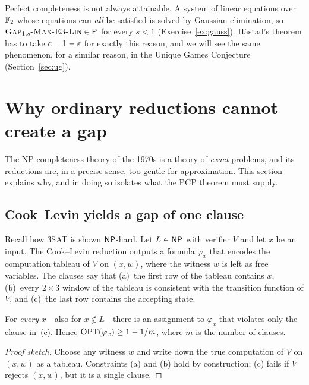 \begin{remark}
Perfect completeness is not always attainable.  A system of linear equations over $\mathbb{F}_2$ whose
equations can \emph{all} be satisfied is solved by Gaussian elimination, so
$\textsc{Gap}_{1,s}\text{-}\textsc{Max-E3-Lin}\in\mathsf{P}$ for every $s<1$ (Exercise~\ref{ex:gauss}).  Håstad's theorem has to
take $c=1-\varepsilon$ for exactly this reason, and we will see the same phenomenon, for a similar
reason, in the Unique Games Conjecture (Section~\ref{sec:ug}).
\end{remark}


\section{Why ordinary reductions cannot create a gap}
\label{sec:nogap}

The NP-completeness theory of the 1970s \citep{Cook71,Levin73,Karp72} is a theory of
\emph{exact} problems, and its reductions are, in a precise sense, too gentle for
approximation.  This section explains why, and in doing so isolates what the PCP theorem
must supply.

\subsection{Cook--Levin yields a gap of one clause}

Recall how $3$SAT is shown $\mathsf{NP}$-hard.  Let $L\in\mathsf{NP}$ with verifier $V$ and let $x$ be an
input.  The Cook--Levin reduction outputs a formula $\varphi_x$ that encodes the computation
tableau of $V$ on $(x,w)$, where the witness $w$ is left as free variables.  The clauses say that
(a)~the first row of the tableau contains $x$, (b)~every $2\times3$ window of the tableau is
consistent with the transition function of $V$, and (c)~the last row contains the accepting state.

\begin{observation}\label{obs:cl}
For \emph{every} $x$---also for $x\notin L$---there is an assignment to $\varphi_x$ that
violates only the clause in~(c).  Hence $\operatorname{OPT}(\varphi_x)\ge 1-1/m$, where $m$ is the number
of clauses.
\end{observation}
\begin{proof}[Proof sketch]
Choose any witness $w$ and write down the true computation of $V$ on $(x,w)$ as a tableau.
Constraints (a) and (b) hold by construction; (c) fails if $V$ rejects $(x,w)$, but it is a single
clause.
\end{proof}

